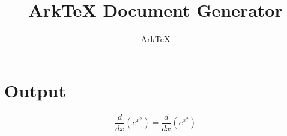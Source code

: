 \documentclass[dvips, 12pt, twoside]{article}
\begin{document}
\title{ArkTeX Document Generator}
\author{ArkTeX}
\maketitle

\medskip

\section*{Output}
\begin{LARGE}$$\frac{d}{dx}(e^{x^2})=\frac{d}{dx}(e^{x^2})$$\end{LARGE}
\end{document}
